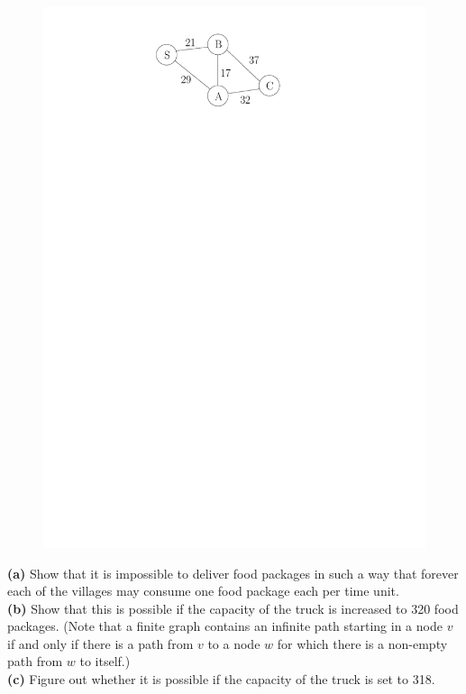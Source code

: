 \documentclass[12pt]{article}
\begin{document}
{\begin{figure}[h!]
      \begin{center}
      \includegraphics[]{Graph}
      \end{center}
      \label{fi:graph}
\end{figure}
\noindent \textbf{(a)} Show that it is impossible to deliver food packages in such a way that forever each of the villages may consume one food package each per time unit.\\
\textbf{(b)} Show that this is possible if the capacity of the truck is increased to 320 food packages. (Note that a finite graph contains an infinite path starting in a node $v$ if and only if there is a path from $v$ to a node $w$ for which there is a non-empty path from $w$ to itself.) \\
\textbf{(c)} Figure out whether it is possible if the capacity of the truck is set to 318.
\vspace{8mm}

}
\end{document}
